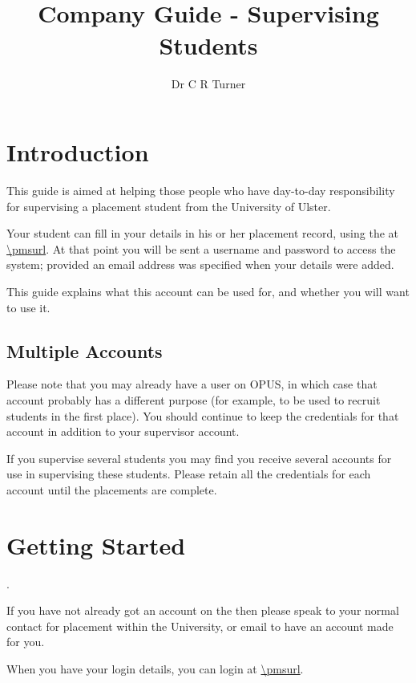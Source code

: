 \documentclass{article}
\author{Dr C R Turner}
\title{\pmslong \\ Company Guide - Supervising Students}
\begin{document}
\maketitle
\newpage
\section{Introduction}

This guide is aimed at helping those people who have day-to-day responsibility
for supervising a placement student from the University of Ulster.

Your student can fill in your details in his or her placement record, using
the \pmslong at \url{\pmsurl}. At that point you will be sent a username and
password to access the system; provided an email address was specified when
your details were added.

This guide explains what this account can be used for, and whether you will want
to use it.

\subsection{Multiple Accounts}

Please note that you may already have a user on OPUS, in which case that account
probably has a different purpose (for example, to be used to recruit students in the
first place). You should continue to keep the credentials for that account in addition
to your supervisor account.

If you supervise several students you may find you receive several accounts for use
in supervising these students. Please retain all the credentials for each account
until the placements are complete.

\section{Getting Started}.

If you have not already got an account on the \pms then please speak to your normal contact
for placement within the University, or email
to have an account made for you.

When you have your login details, you can login at \url{\pmsurl}.
\end{document}
